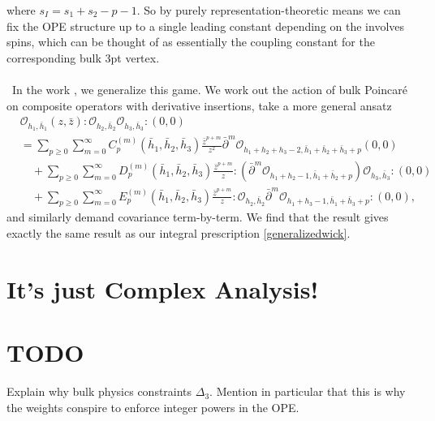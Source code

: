 \documentclass[11pt,letterpaper]{article}
\begin{document}
where $s_I = s_1+s_2-p-1$. So by purely representation-theoretic means we can fix the OPE structure up to a single leading constant depending on the involves spins, which can be thought of as essentially the coupling constant for the corresponding bulk 3pt vertex.\\
\\
\
In the work \cite{Calkins:2026hpg}, we generalize this game. We work out the action of bulk Poincar\'{e} on composite operators with derivative insertions, take a more general ansatz \begin{equation} \label{ansatz-single-particle-multi-OPE}
\begin{aligned}
& \mathcal{O}_{h_1, \bar{h}_1}(z , \bar{z} ) : \mathcal{O}_{h_2, \bar{h}_2} \mathcal{O}_{h_3,\bar{h}_3}:(0,0) \\
& = \sum_{p \geq 0} \sum_{m=0}^\infty C_p^{(m)}(\bar{h}_1, \bar{h}_2, \bar{h}_3) \frac{\bar{z}^{p+m}}{z^2} \bar{\partial}^m \mathcal{O}_{h_1+h_2+h_3-2, \bar{h}_1+\bar{h}_2+\bar{h}_3+p} (0,0) \\
& \quad + \sum_{p \geq 0} \sum_{m=0}^\infty D_p^{(m)}(\bar{h}_1, \bar{h}_2, \bar{h}_3) \frac{\bar{z}^{p+m}}{z} : \left(\bar{\partial}^m \mathcal{O}_{h_1+h_2-1, \bar{h}_1+\bar{h}_2+p} \right) \mathcal{O}_{h_3, \bar{h}_3}: (0,0)\\
&  \quad  +\sum_{p \geq 0} \sum_{m=0}^\infty E_p^{(m)}(\bar{h}_1, \bar{h}_2, \bar{h}_3) \frac{\bar{z}^{p+m}}{z} :\mathcal{O}_{h_2, \bar{h}_2}\bar{\partial}^m \mathcal{O}_{h_1+h_3-1, \bar{h}_1+\bar{h}_3+p}: (0,0),
\end{aligned}
\end{equation}
and similarly demand covariance term-by-term. We find that the result gives exactly the same result as our integral prescription \eqref{generalizedwick}.


\section{It's just Complex Analysis!}







\section{TODO}
Explain why bulk physics constraints $\Delta_3$. Mention in particular that this is why the weights conspire to enforce integer powers in the OPE.




\end{document}
